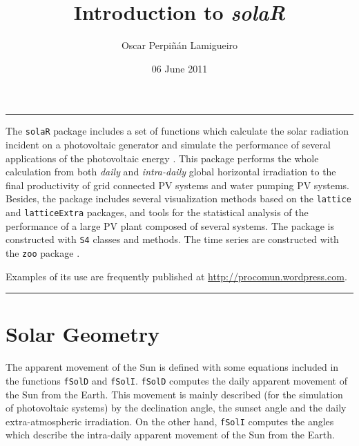 \documentclass[oldfontcommands,a4paper]{memoir}
\begin{document}

\begin{titlingpage}

\title{Introduction to \emph{solaR}}

\author{Oscar Perpiñán Lamigueiro}


\date{06 June 2011}


\maketitle


\end{titlingpage}

\frontmatter

\chapterprecis{\vfill{}}

\rule[.5ex]{\linewidth}{1pt} 

The  \texttt{solaR} package includes a set of functions which calculate
the solar radiation incident on a photovoltaic generator and simulate the 
performance of several applications of the photovoltaic energy \cite{Perpinan2011}.
This package performs the whole calculation from both \emph{daily} and 
\emph{intra-daily} global horizontal irradiation to the final productivity of 
grid connected PV systems and water pumping PV systems. 
Besides, the package includes several visualization methods based on
the \texttt{lattice} and \texttt{latticeExtra} packages, and tools for the statistical analysis of
the performance of a large PV plant composed of several systems.
The package is constructed with \texttt{S4} classes and methods. 
The time series are constructed with the \texttt{zoo} package \cite{Zeileis.Grothendieck2005}.

Examples of its use are frequently published at
\url{http://procomun.wordpress.com}.

\rule[.5ex]{\linewidth}{1pt} 

\chapterprecis{\vfill{}}

\mainmatter



\chapter{Solar Geometry}

The apparent movement of the Sun is defined with some equations included in 
the functions  \texttt{fSolD} and \texttt{fSolI}. \texttt{fSolD} computes the daily apparent movement of the Sun from the Earth. This movement is mainly described (for the simulation of photovoltaic systems) by the declination angle, the sunset angle and the daily extra-atmospheric irradiation.
On the other hand, \texttt{fSolI} computes the angles which describe the intra-daily apparent movement of the Sun from the Earth. 
\end{document}
